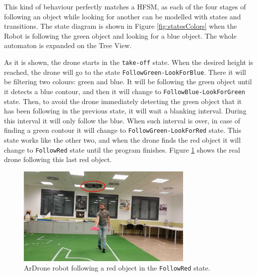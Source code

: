 \documentclass[journal,twoside]{JoPhA}
\begin{document}
This kind of behaviour perfectly matches a HFSM, as each of the four stages of following an object while looking for another can be modelled with states and transitions. The state diagram is shown in Figure \ref{fig:statesColors} when the Robot is following the green object and looking for a blue object. The whole automaton is expanded on the Tree View.

As it is shown, the drone starts in the \texttt{take-off} state. When the desired height is reached, the drone will go to the state \texttt{FollowGreen-LookForBlue}. There it will be filtering two colours: green and blue. It will be following the green object until it detects a blue contour, and then it will change to \texttt{FollowBlue-LookForGreen} state. Then, to avoid the drone immediately detecting the green object that it has been following in the previous state, it will wait a blanking interval. During this interval it will only follow the blue. When such interval is over, in case of finding a green contour it will change to \texttt{FollowGreen-LookForRed} state. This state works like the other two, and when the drone finds the red object it will change to \texttt{FollowRed} state until the program finishes. Figure \ref{fig:followingRed} shows the real drone following this last red object.


\begin{figure}[ht!]
\begin{center}
        \includegraphics[width=8.5cm]{figs/followingRed.jpg}
\end{center}
\caption{ArDrone robot following a red object in the \texttt{FollowRed} state.}
\label{fig:followingRed}
\end{figure}
\end{document}
